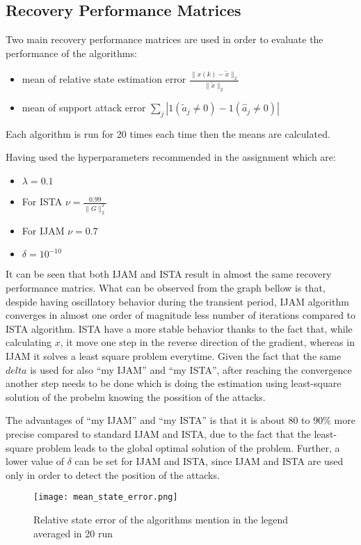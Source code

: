 \subsection{Recovery Performance Matrices}
Two main recovery performance matrices are used in order to evaluate the performance of the algorithms:
\begin{itemize}
	\item mean of relative state estimation error $\frac{\|x(k) - \tilde{x}\|_2}{\|\tilde{x}\|_2}$
	\item mean of support attack error $\sum_j |1(\tilde{a}_j \neq 0) - 1(\hat{a}_j \neq 0)|$
\end{itemize}
Each algorithm is run for 20 times each time then the means are calculated.

Having used the hyperparameters recommended in the assignment which are:
\begin{itemize}
	\item $\lambda = 0.1$
	\item For ISTA $\nu = \frac{0.99}{\|G\|_2^2}$
	\item For IJAM $\nu = 0.7$
	\item $\delta = 10^{-10}$
\end{itemize}

It can be seen that both IJAM and ISTA result in almost the same recovery performance matrics. What can be observed from the graph bellow is that, despide having oscillatory behavior during the transient period, IJAM algorithm converges in almost one order of magnitude less number of iterations compared to ISTA algorithm. ISTA have a more stable behavior thanks to the fact that, while calculating $x$, it move one step in the reverse direction of the gradient, whereas in IJAM it solves a least square problem everytime. Given the fact that the same $delta$ is used for also ``my IJAM'' and ``my ISTA'', after reaching the convergence another step needs to be done which is doing the estimation using least-square solution of the probelm knowing the possition of the attacks.

The advantages of ``my IJAM'' and ``my ISTA'' is that it is about 80 to 90\% more precise compared to standard IJAM and ISTA, due to the fact that the least-square problem leads to the global optimal solution of the problem. Further, a lower value of $\delta$ can be set for IJAM and ISTA, since IJAM and ISTA are used only in order to detect the position of the attacks.

\begin{figure}[H] %
    \centering
    \texttt{[image: mean\_state\_error.png]} %
    \caption{Relative state error of the algorithms mention in the legend averaged in 20 run}
    \label{fig:example}
\end{figure}


